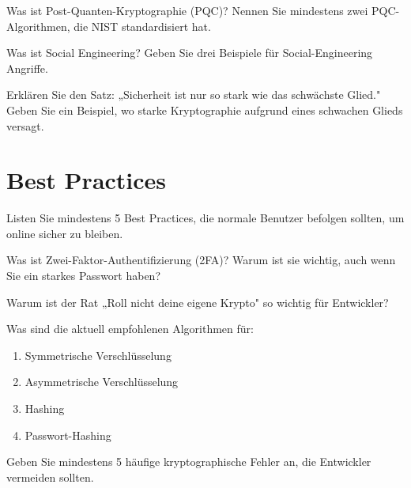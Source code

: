 \documentclass[11pt,a4paper]{report}
\begin{document}
\begin{ex}
Was ist Post-Quanten-Kryptographie (PQC)? Nennen Sie mindestens zwei PQC-Algorithmen, die NIST standardisiert hat.
\end{ex}

\begin{ex}
Was ist Social Engineering? Geben Sie drei Beispiele für Social-Engineering Angriffe.
\end{ex}

\begin{ex}
Erklären Sie den Satz: „Sicherheit ist nur so stark wie das schwächste Glied." Geben Sie ein Beispiel, wo starke Kryptographie aufgrund eines schwachen Glieds versagt.
\end{ex}

\section{Best Practices}

\begin{ex}
Listen Sie mindestens 5 Best Practices, die normale Benutzer befolgen sollten, um online sicher zu bleiben.
\end{ex}

\begin{ex}
Was ist Zwei-Faktor-Authentifizierung (2FA)? Warum ist sie wichtig, auch wenn Sie ein starkes Passwort haben?
\end{ex}

\begin{ex}
Warum ist der Rat „Roll nicht deine eigene Krypto" so wichtig für Entwickler?
\end{ex}

\begin{ex}
Was sind die aktuell empfohlenen Algorithmen für:
\begin{enumerate}[label=\alph*)]
    \item Symmetrische Verschlüsselung
    \item Asymmetrische Verschlüsselung
    \item Hashing
    \item Passwort-Hashing
\end{enumerate}
\end{ex}

\begin{ex}
Geben Sie mindestens 5 häufige kryptographische Fehler an, die Entwickler vermeiden sollten.
\end{ex}
\end{document}
